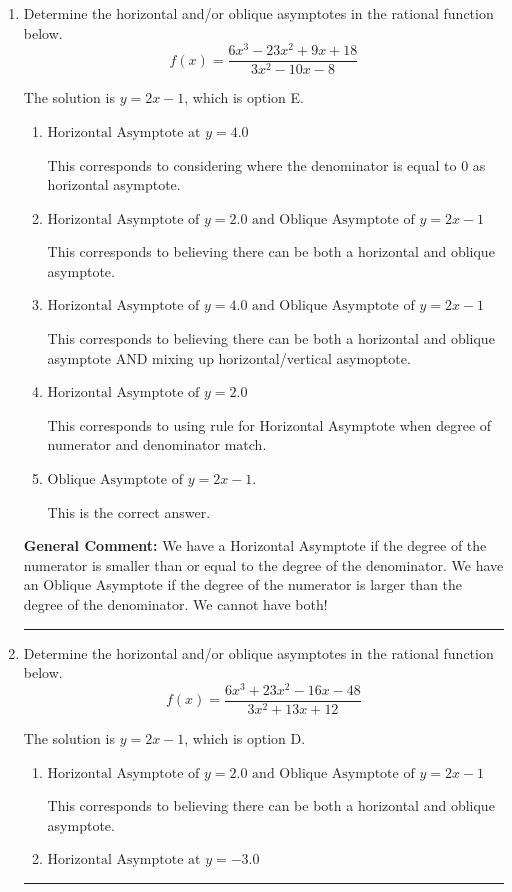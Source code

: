 \documentclass{extbook}[14pt]
\newcommand{\litem}[1]{\item #1

\rule{\textwidth}{0.4pt}}
\begin{document}
\begin{enumerate}\litem{
Determine the horizontal and/or oblique asymptotes in the rational function below.
\[ f(x) = \frac{6x^{3} -23 x^{2} +9 x + 18}{3x^{2} -10 x -8} \]

The solution is \( y = 2x -1 \), which is option E.\begin{enumerate}[label=\Alph*.]
\item \( \text{Horizontal Asymptote at } y = 4.0 \)

This corresponds to considering where the denominator is equal to 0 as horizontal asymptote.
\item \( \text{Horizontal Asymptote of } y = 2.0 \text{ and Oblique Asymptote of } y = 2x -1 \)

This corresponds to believing there can be both a horizontal and oblique asymptote.
\item \( \text{Horizontal Asymptote of } y = 4.0 \text{ and Oblique Asymptote of } y = 2x -1 \)

This corresponds to believing there can be both a horizontal and oblique asymptote AND mixing up horizontal/vertical asymoptote.
\item \( \text{Horizontal Asymptote of } y = 2.0  \)

This corresponds to using rule for Horizontal Asymptote when degree of numerator and denominator match.
\item \( \text{Oblique Asymptote of } y = 2x -1. \)

This is the correct answer.
\end{enumerate}

\textbf{General Comment:} We have a Horizontal Asymptote if the degree of the numerator is smaller than or equal to the degree of the denominator. We have an Oblique Asymptote if the degree of the numerator is larger than the degree of the denominator. We cannot have both!
}
\litem{
Determine the horizontal and/or oblique asymptotes in the rational function below.
\[ f(x) = \frac{6x^{3} +23 x^{2} -16 x -48}{3x^{2} +13 x + 12} \]

The solution is \( y = 2x -1 \), which is option D.\begin{enumerate}[label=\Alph*.]
\item \( \text{Horizontal Asymptote of } y = 2.0 \text{ and Oblique Asymptote of } y = 2x -1 \)

This corresponds to believing there can be both a horizontal and oblique asymptote.
\item \( \text{Horizontal Asymptote at } y = -3.0 \)


\end{enumerate}}
\end{enumerate}
\end{document}
